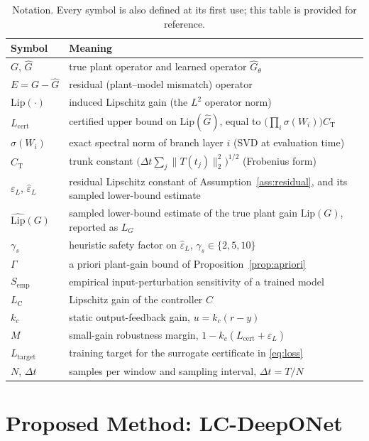 \documentclass[11pt,sagev,times]{sagej}
\newcommand{\Ltwo}{L^2}
\newcommand{\Ghat}{\hat{G}}
\newcommand{\Lhat}{L_{\mathrm{cert}}}
\newcommand{\epsL}{\varepsilon_L}
\newcommand{\LC}{L_{\mathrm{C}}}
\newcommand{\Ltarget}{L_{\mathrm{target}}}
\begin{document}
\begin{table}[t]
\centering\small
\caption{Notation. Every symbol is also defined at its first use; this table
is provided for reference.}
\label{tab:notation}
\begin{tabular}{ll}
\toprule
Symbol & Meaning \\
\midrule
$G$, $\Ghat$ & true plant operator and learned operator $\Ghat_\theta$ \\
$E=G-\Ghat$ & residual (plant--model mismatch) operator \\
$\mathrm{Lip}(\cdot)$ & induced Lipschitz gain (the $\Ltwo$ operator norm) \\
$\Lhat$ & certified upper bound on $\mathrm{Lip}(\Ghat)$, equal to
$\big(\prod_i\sigma(W_i)\big)C_{\mathrm{T}}$ \\
$\sigma(W_i)$ & exact spectral norm of branch layer $i$ (SVD at evaluation time) \\
$C_{\mathrm{T}}$ & trunk constant $\big(\Delta t\sum_j\|T(t_j)\|_2^2\big)^{1/2}$ (Frobenius form) \\
$\epsL$, $\hat\epsL$ & residual Lipschitz constant of Assumption~\ref{ass:residual},
and its sampled lower-bound estimate \\
$\widehat{\mathrm{Lip}}(G)$ & sampled lower-bound estimate of the true plant
gain $\mathrm{Lip}(G)$, reported as $L_G$ \\
$\gamma_s$ & heuristic safety factor on $\hat\epsL$,
$\gamma_s\in\{2,5,10\}$ \\
$\Gamma$ & a priori plant-gain bound of Proposition~\ref{prop:apriori} \\
$S_{\mathrm{emp}}$ & empirical input-perturbation sensitivity of a trained model \\
$\LC$ & Lipschitz gain of the controller $C$ \\
$k_c$ & static output-feedback gain, $u=k_c(r-y)$ \\
$M$ & small-gain robustness margin, $1-k_c(\Lhat+\hat\epsL)$ \\
$\Ltarget$ & training target for the surrogate certificate in \eqref{eq:loss} \\
$N$, $\Delta t$ & samples per window and sampling interval, $\Delta t=T/N$ \\
\bottomrule
\end{tabular}
\end{table}

\section{Proposed Method: LC-DeepONet}\label{sec:method}
\end{document}
